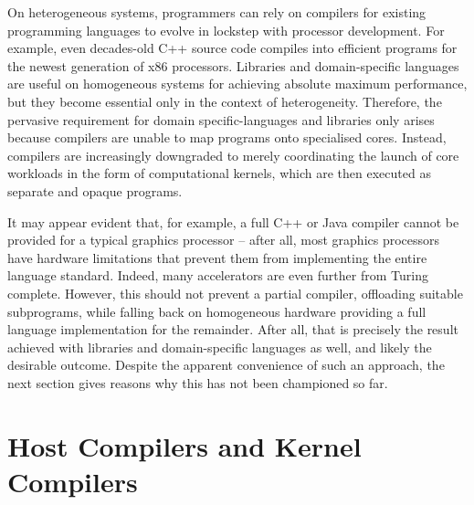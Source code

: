     On heterogeneous systems, programmers can rely on compilers for existing
    programming languages to evolve in lockstep with processor development.
    For example, even decades-old C++ source code compiles into efficient
    programs for the newest generation of x86 processors.
    Libraries and domain-specific languages are useful on homogeneous systems
    for achieving absolute maximum performance, but they become essential only
    in the context of heterogeneity.
    Therefore, the pervasive requirement for domain specific-languages and
    libraries only arises because compilers are unable to map programs onto
    specialised cores.
    Instead, compilers are increasingly downgraded to merely coordinating the
    launch of core workloads in the form of computational kernels, which are
    then executed as separate and opaque programs.

    It may appear evident that, for example, a full C++ or Java compiler cannot
    be provided for a typical graphics processor -- after all, most graphics
    processors have hardware limitations that prevent them from implementing the
    entire language standard.
    Indeed, many accelerators are even further from Turing complete.
    However, this should not prevent a partial compiler, offloading suitable
    subprograms, while falling back on homogeneous hardware providing a full
    language implementation for the remainder.
    After all, that is precisely the result achieved with libraries and
    domain-specific languages as well, and likely the desirable outcome.
    Despite the apparent convenience of such an approach, the next section gives
    reasons why this has not been championed so far.

\section{Host Compilers and Kernel Compilers}

